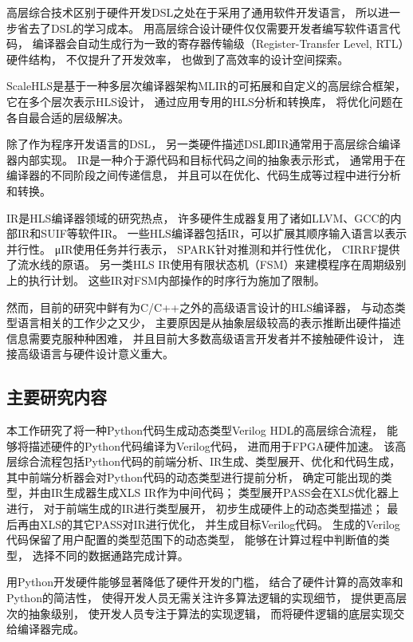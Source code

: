 高层综合技术区别于硬件开发DSL之处在于采用了通用软件开发语言，
所以进一步省去了DSL的学习成本。
用高层综合设计硬件仅仅需要开发者编写软件语言代码，
编译器会自动生成行为一致的寄存器传输级（Register-Transfer Level, RTL）硬件结构，
不仅提升了开发效率，
也做到了高效率的设计空间探索。

ScaleHLS\cite{scalehls}是基于一种多层次编译器架构MLIR\cite{mlir}的可拓展和自定义的高层综合框架，
它在多个层次表示HLS设计，
通过应用专用的HLS分析和转换库，
将优化问题在各自最合适的层级解决。

除了作为程序开发语言的DSL，
另一类硬件描述DSL即IR通常用于高层综合编译器内部实现。
IR是一种介于源代码和目标代码之间的抽象表示形式，
通常用于在编译器的不同阶段之间传递信息，
并且可以在优化、代码生成等过程中进行分析和转换。

IR是HLS编译器领域的研究热点，
许多硬件生成器复用了诸如LLVM、GCC的内部IR和SUIF等软件IR。
一些HLS编译器包括IR，可以扩展其顺序输入语言以表示并行性。
μIR\cite{muir}使用任务并行表示，
SPARK\cite{spark}针对推测和并行性优化，
CIRRF\cite{cirrf}提供了流水线的原语。
另一类HLS IR使用有限状态机（FSM）来建模程序在周期级别上的执行计划。
这些IR对FSM内部操作的时序行为施加了限制。

然而，目前的研究中鲜有为C/C++之外的高级语言设计的HLS编译器，
与动态类型语言相关的工作少之又少，
主要原因是从抽象层级较高的表示推断出硬件描述信息需要克服种种困难，
并且目前大多数高级语言开发者并不接触硬件设计，
连接高级语言与硬件设计意义重大。

\subsection{主要研究内容}

本工作研究了将一种Python代码生成动态类型Verilog HDL的高层综合流程，
能够将描述硬件的Python代码编译为Verilog代码，
进而用于FPGA硬件加速。
该高层综合流程包括Python代码的前端分析、IR生成、类型展开、优化和代码生成，
其中前端分析器会对Python代码的动态类型进行提前分析，
确定可能出现的类型，并由IR生成器生成XLS IR作为中间代码；
类型展开PASS会在XLS优化器上进行，
对于前端生成的IR进行类型展开，
初步生成硬件上的动态类型描述；
最后再由XLS的其它PASS对IR进行优化，
并生成目标Verilog代码。
生成的Verilog代码保留了用户配置的类型范围下的动态类型，
能够在计算过程中判断值的类型，
选择不同的数据通路完成计算。

用Python开发硬件能够显著降低了硬件开发的门槛，
结合了硬件计算的高效率和Python的简洁性，
使得开发人员无需关注许多算法逻辑的实现细节，
提供更高层次的抽象级别，
使开发人员专注于算法的实现逻辑，
而将硬件逻辑的底层实现交给编译器完成。

